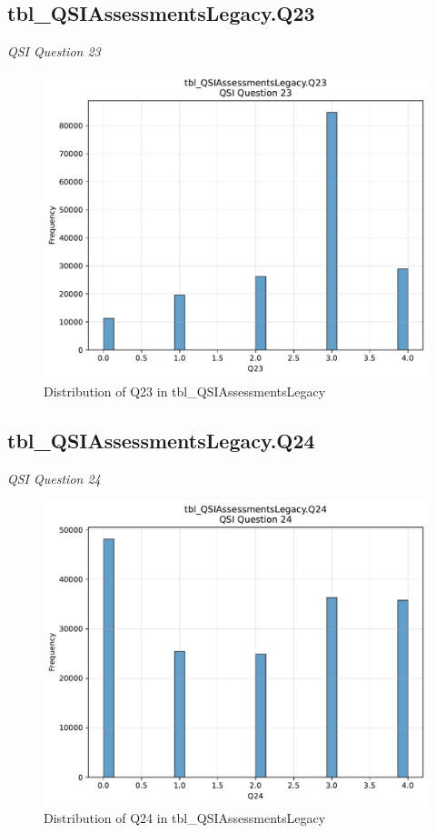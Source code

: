 \subsection{tbl\_QSIAssessmentsLegacy.Q23}
\textit{QSI Question 23}

\begin{figure}[htbp]
\centering
\includegraphics[width=\textwidth]{figures/dbo_tbl_QSIAssessmentsLegacy_Q23.pdf}
\caption{Distribution of Q23 in tbl\_QSIAssessmentsLegacy}
\end{figure}\newpage

\subsection{tbl\_QSIAssessmentsLegacy.Q24}
\textit{QSI Question 24}

\begin{figure}[htbp]
\centering
\includegraphics[width=\textwidth]{figures/dbo_tbl_QSIAssessmentsLegacy_Q24.pdf}
\caption{Distribution of Q24 in tbl\_QSIAssessmentsLegacy}
\end{figure}\newpage

